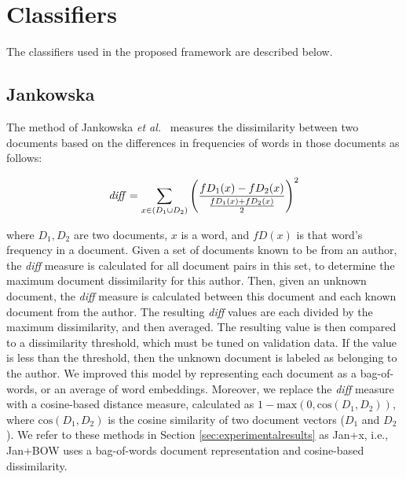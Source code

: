 \documentclass[11pt]{article}
\begin{document}
\section{Classifiers}\label{sec:classifiers}

%
The classifiers used in the proposed framework are described below.

\subsection{Jankowska} The method of Jankowska \emph{et al.}~\cite{jankowska2014} measures
the dissimilarity between two documents based on the differences in
frequencies of words in those documents as follows:
\begin{small}
\begin{equation*}\label{diff}
\small
\mathit{diff} = {\sum_{x\in(D_1 \cup
    D_2)}{\left(\dfrac{fD_1(x)-fD_2(x)}{\frac{fD_1(x)+fD_2(x)}{2}}\right)}^2}
\end{equation*}
\end{small}


\noindent
where $D_1, D_2$ are two documents, $x$ is a word, and $fD(x)$ is that
word's frequency in a document. Given a set of documents known to be
from an author, the \textit{diff} measure is calculated for all
document pairs in this set, to determine the maximum document
dissimilarity for this author. Then, given an unknown document, the
\textit{diff} measure is calculated between this document and each
known document from the author. The resulting \textit{diff} values are
each divided by the maximum dissimilarity, and then averaged. The
resulting value is then compared to a dissimilarity threshold, which
must be tuned on validation data. If the value is less than the
threshold, then the unknown document is labeled as belonging to the
author.
We improved this model by representing each document as a
bag-of-words, or an average of word embeddings. Moreover, we replace
the \textit{diff} measure with a cosine-based distance measure,
calculated as $1 - \textrm{max}(0, \textrm{cos}(D_1, D_2))$, where
$\textrm{cos}(D_1, D_2)$ is the cosine similarity of two document
vectors ($D_1$ and $D_2$). We refer to these methods in Section
\ref{sec:experimentalresults} as Jan+x, i.e., Jan+BOW uses a
bag-of-words document representation and cosine-based dissimilarity.

\end{document}
